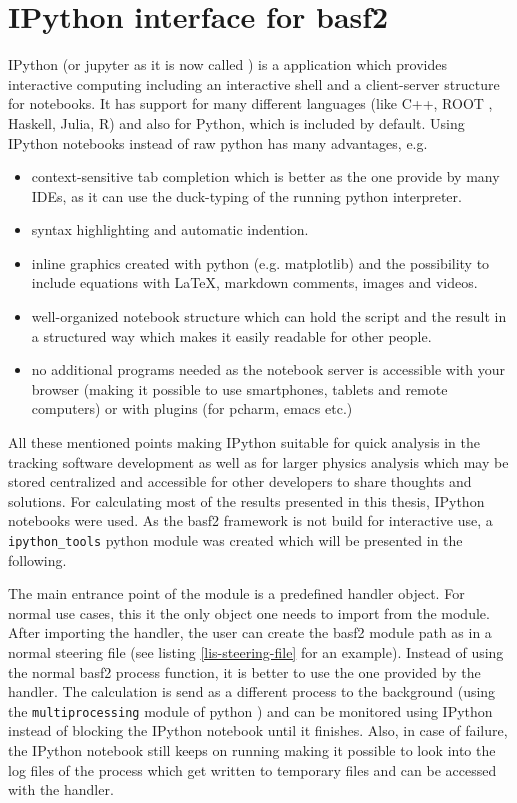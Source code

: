 \section{IPython interface for basf2}

IPython (or jupyter as it is now called \cite{jupyter}) is a application which provides interactive computing including an interactive shell and a client-server structure for notebooks. It has support for many different languages (like C++, ROOT \cite{root_ipython}, Haskell, Julia, R) and also for Python, which is included by default. Using IPython notebooks instead of raw python has many advantages, e.g.
\begin{itemize}
  \item context-sensitive tab completion which is better as the one provide by many IDEs, as it can use the duck-typing of the running python interpreter.
  \item syntax highlighting and automatic indention.
  \item inline graphics created with python (e.g. matplotlib) and the possibility to include equations with \LaTeX, markdown comments, images and videos.
  \item well-organized notebook structure which can hold the script and the result in a structured way which makes it easily readable for other people.
  \item no additional programs needed as the notebook server is accessible with your browser (making it possible to use smartphones, tablets and remote computers) or with plugins (for pcharm, emacs etc.)
\end{itemize}

All these mentioned points making IPython suitable for quick analysis in the tracking software development as well as for larger physics analysis which may be stored centralized and accessible for other developers to share thoughts and solutions. For calculating most of the results presented in this thesis, IPython notebooks were used. As the basf2 framework is not build for interactive use, a \texttt{ipython\_tools} python module was created which will be presented in the following.

The main entrance point of the module is a predefined handler object. For normal use cases, this it the only object one needs to import from the module. After importing the handler, the user can create the basf2 module path as in a normal steering file (see listing \ref{lis-steering-file} for an example). Instead of using the normal basf2 process function, it is better to use the one provided by the handler. The calculation is send as a different process to the background (using the \texttt{multiprocessing} module of python \cite{multiprocessing}) and can be monitored using IPython instead of blocking the IPython notebook until it finishes. Also, in case of failure, the IPython notebook still keeps on running making it possible to look into the log files of the process which get written to temporary files and can be accessed with the handler.

